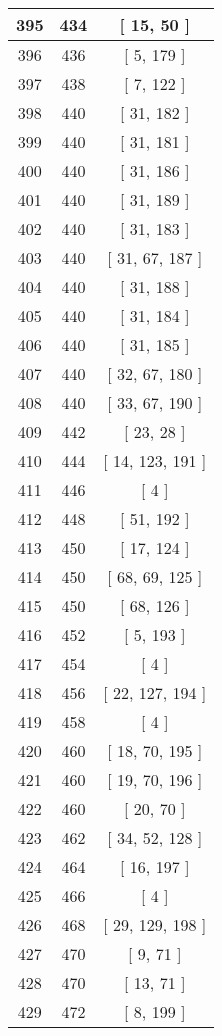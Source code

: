 \begin{center}
\begin{longtable}[H]{|| c c c ||}
\hline
395 & 434 & [ 15, 50 ] \\ 
\hline
396 & 436 & [ 5, 179 ] \\ 
\hline
397 & 438 & [ 7, 122 ] \\ 
\hline
398 & 440 & [ 31, 182 ] \\ 
\hline
399 & 440 & [ 31, 181 ] \\ 
\hline
400 & 440 & [ 31, 186 ] \\ 
\hline
401 & 440 & [ 31, 189 ] \\ 
\hline
402 & 440 & [ 31, 183 ] \\ 
\hline
403 & 440 & [ 31, 67, 187 ] \\ 
\hline
404 & 440 & [ 31, 188 ] \\ 
\hline
405 & 440 & [ 31, 184 ] \\ 
\hline
406 & 440 & [ 31, 185 ] \\ 
\hline
407 & 440 & [ 32, 67, 180 ] \\ 
\hline
408 & 440 & [ 33, 67, 190 ] \\ 
\hline
409 & 442 & [ 23, 28 ] \\ 
\hline
410 & 444 & [ 14, 123, 191 ] \\ 
\hline
411 & 446 & [ 4 ] \\ 
\hline
412 & 448 & [ 51, 192 ] \\ 
\hline
413 & 450 & [ 17, 124 ] \\ 
\hline
414 & 450 & [ 68, 69, 125 ] \\ 
\hline
415 & 450 & [ 68, 126 ] \\ 
\hline
416 & 452 & [ 5, 193 ] \\ 
\hline
417 & 454 & [ 4 ] \\ 
\hline
418 & 456 & [ 22, 127, 194 ] \\ 
\hline
419 & 458 & [ 4 ] \\ 
\hline
420 & 460 & [ 18, 70, 195 ] \\ 
\hline
421 & 460 & [ 19, 70, 196 ] \\ 
\hline
422 & 460 & [ 20, 70 ] \\ 
\hline
423 & 462 & [ 34, 52, 128 ] \\ 
\hline
424 & 464 & [ 16, 197 ] \\ 
\hline
425 & 466 & [ 4 ] \\ 
\hline
426 & 468 & [ 29, 129, 198 ] \\ 
\hline
427 & 470 & [ 9, 71 ] \\ 
\hline
428 & 470 & [ 13, 71 ] \\ 
\hline
429 & 472 & [ 8, 199 ] \\ 

\end{longtable}
\end{center}

